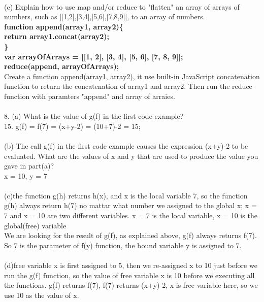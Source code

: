 \documentclass[12pt]{article}
\begin{document}
\vspace{1mm}\\
(c) Explain how to use map and/or reduce to "flatten" an array of arrays of numbers, such as [[1,2],[3,4],[5,6],[7,8,9]], to an array of numbers.\\
\textbf{ function append(array1, array2)\{\\
\indent return array1.concat(array2);\\
\}\\
var arrayOfArrays = [[1, 2], [3, 4], [5, 6], [7, 8, 9]];\\
reduce(append, arrayOfArrays);}\\
Create a function append(array1, array2), it use built-in JavaScript concatenation function to return the concatenation of array1 and array2. Then run the reduce function with paramters "append" and array of arraies.\\
\vspace{1mm}\\
8. (a) What is the value of g(f) in the first code example?\\
15.   \indent g(f) = f(7) = (x+y-2) = (10+7)-2 = 15;\\
\vspace{1mm}\\
(b) The call g(f) in the first code example causes the expression (x+y)-2 to be evaluated. What are the values of x and y that are used to produce the value you gave in part(a)?\\
x = 10, y = 7\\
\vspace{1mm}\\
(c)the function g(h) returns h(x), and x is the local variable 7, so the function g(h) always return h(7) no mattar what number we assigned to the global x; x = 7 and x = 10 are two different variables. x = 7 is the local variable, x = 10 is the global(free) variable\\
We are looking for the result of g(f), as explained above, g(f) always returns f(7). So 7 is the parameter of f(y) function, the bound variable y is assigned to 7.\\
\vspace{1mm}\\
(d)free variable x is first assigned to 5, then we re-assigned x to 10 just before we run the g(f) function, so the value of free variable x is 10 before we executing all the functions. g(f) returns f(7), f(7) returns (x+y)-2, x is free variable here, so we use 10 as the value of x. \\
\end{document}
